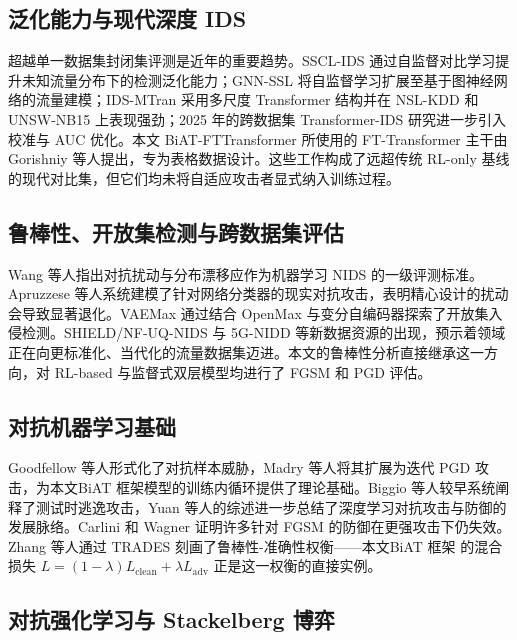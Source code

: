 \documentclass[12pt,a4paper]{ctexart}
\begin{document}
\subsection{泛化能力与现代深度 IDS}

超越单一数据集封闭集评测是近年的重要趋势。SSCL-IDS 通过自监督对比学习提升未知流量分布下的检测泛化能力\cite{golchin2024ssclids}；GNN-SSL 将自监督学习扩展至基于图神经网络的流量建模\cite{xu2024gnnssl}；IDS-MTran 采用多尺度 Transformer 结构并在 NSL-KDD 和 UNSW-NB15 上表现强劲\cite{xi2024idsmtran}；2025 年的跨数据集 Transformer-IDS 研究进一步引入校准与 AUC 优化\cite{xin2025crossdatasettransformer}。本文 BiAT-FTTransformer 所使用的 FT-Transformer 主干由 Gorishniy 等人提出，专为表格数据设计\cite{gorishniy2021fttransformer}。这些工作构成了远超传统 RL-only 基线的现代对比集，但它们均未将自适应攻击者显式纳入训练过程。

\subsection{鲁棒性、开放集检测与跨数据集评估}

Wang 等人指出对抗扰动与分布漂移应作为机器学习 NIDS 的一级评测标准\cite{wang2023robustnessnids}。Apruzzese 等人系统建模了针对网络分类器的现实对抗攻击，表明精心设计的扰动会导致显著退化\cite{apruzzese2022adversarial_nids}。VAEMax 通过结合 OpenMax 与变分自编码器探索了开放集入侵检测\cite{qiu2024vaemax}。SHIELD/NF-UQ-NIDS 与 5G-NIDD 等新数据资源的出现，预示着领域正在向更标准化、当代化的流量数据集迈进\cite{shield2025,sarhan2021nfuqnids,siriwardhana2025nidd}。本文的鲁棒性分析直接继承这一方向，对 RL-based 与监督式双层模型均进行了 FGSM 和 PGD 评估。

\subsection{对抗机器学习基础}

Goodfellow 等人形式化了对抗样本威胁\cite{goodfellow2015fgsm}，Madry 等人将其扩展为迭代 PGD 攻击\cite{madry2018pgd}，为本文BiAT 框架模型的训练内循环提供了理论基础。Biggio 等人较早系统阐释了测试时逃逸攻击\cite{biggio2013evasion}，Yuan 等人的综述进一步总结了深度学习对抗攻击与防御的发展脉络\cite{yuan2019adv_survey}。Carlini 和 Wagner 证明许多针对 FGSM 的防御在更强攻击下仍失效\cite{carlini2017cw}。Zhang 等人通过 TRADES 刻画了鲁棒性-准确性权衡\cite{zhang2019trades}——本文BiAT 框架 的混合损失 $L = (1-\lambda)L_{\text{clean}} + \lambda L_{\text{adv}}$ 正是这一权衡的直接实例。

\subsection{对抗强化学习与 Stackelberg 博弈}
\end{document}
